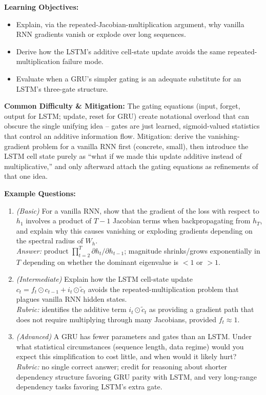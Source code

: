 \documentclass[11pt]{article}
\begin{document}
\textbf{Learning Objectives:}
\begin{itemize}
  \item Explain, via the repeated-Jacobian-multiplication argument, why vanilla RNN gradients vanish or explode over long sequences.
  \item Derive how the LSTM's additive cell-state update avoids the same repeated-multiplication failure mode.
  \item Evaluate when a GRU's simpler gating is an adequate substitute for an LSTM's three-gate structure.
\end{itemize}

\textbf{Common Difficulty \& Mitigation:} The gating equations (input, forget, output for LSTM; update, reset for GRU) create notational overload that can obscure the single unifying idea -- gates are just learned, sigmoid-valued statistics that control an additive information flow. Mitigation: derive the vanishing-gradient problem for a vanilla RNN first (concrete, small), then introduce the LSTM cell state purely as ``what if we made this update additive instead of multiplicative,'' and only afterward attach the gating equations as refinements of that one idea.

\textbf{Example Questions:}
\begin{enumerate}
  \item \textit{(Basic)} For a vanilla RNN, show that the gradient of the loss with respect to $h_1$ involves a product of $T-1$ Jacobian terms when backpropagating from $h_T$, and explain why this causes vanishing or exploding gradients depending on the spectral radius of $W_h$. \\
  \textit{Answer:} product $\prod_{t=2}^{T} \partial h_t/\partial h_{t-1}$; magnitude shrinks/grows exponentially in $T$ depending on whether the dominant eigenvalue is $<1$ or $>1$.
  \item \textit{(Intermediate)} Explain how the LSTM cell-state update $c_t = f_t \odot c_{t-1} + i_t \odot \tilde c_t$ avoids the repeated-multiplication problem that plagues vanilla RNN hidden states. \\
  \textit{Rubric:} identifies the additive term $i_t \odot \tilde c_t$ as providing a gradient path that does not require multiplying through many Jacobians, provided $f_t \approx 1$.
  \item \textit{(Advanced)} A GRU has fewer parameters and gates than an LSTM. Under what statistical circumstances (sequence length, data regime) would you expect this simplification to cost little, and when would it likely hurt? \\
  \textit{Rubric:} no single correct answer; credit for reasoning about shorter dependency structure favoring GRU parity with LSTM, and very long-range dependency tasks favoring LSTM's extra gate.
\end{enumerate}
\end{document}
